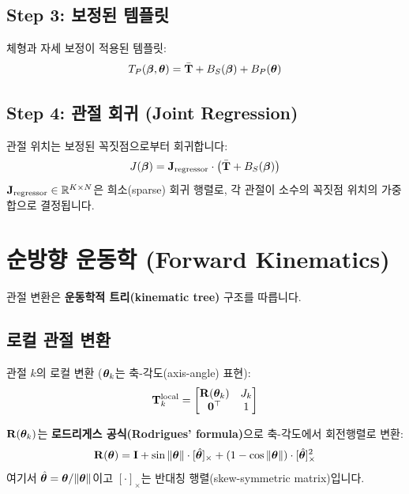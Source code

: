 \documentclass[11pt, a4paper]{report}
\begin{document}
\subsection{Step 3: 보정된 템플릿}

체형과 자세 보정이 적용된 템플릿:
\begin{equation}
T_P(\bm{\beta}, \bm{\theta}) = \bar{\mathbf{T}} + B_S(\bm{\beta}) + B_P(\bm{\theta})
\end{equation}

\subsection{Step 4: 관절 회귀 (Joint Regression)}

관절 위치는 보정된 꼭짓점으로부터 회귀합니다:
\begin{equation}
J(\bm{\beta}) = \mathbf{J}_{\text{regressor}} \cdot \big( \bar{\mathbf{T}} + B_S(\bm{\beta}) \big)
\label{eq:joint_regression}
\end{equation}
$\mathbf{J}_{\text{regressor}} \in \mathbb{R}^{K \times N}$은 희소(sparse) 회귀 행렬로, 각 관절이 소수의 꼭짓점 위치의 가중합으로 결정됩니다.


\section{순방향 운동학 (Forward Kinematics)}
\label{sec:fk}

관절 변환은 \textbf{운동학적 트리(kinematic tree)} 구조를 따릅니다.

\subsection{로컬 관절 변환}

관절 $k$의 로컬 변환 ($\bm{\theta}_k$는 축-각도(axis-angle) 표현):
\begin{equation}
\mathbf{T}_k^{\text{local}} =
\begin{bmatrix}
\mathbf{R}(\bm{\theta}_k) & J_k \\
\mathbf{0}^\top & 1
\end{bmatrix}
\end{equation}

$\mathbf{R}(\bm{\theta}_k)$는 \textbf{로드리게스 공식(Rodrigues' formula)}으로 축-각도에서 회전행렬로 변환:
\begin{equation}
\mathbf{R}(\bm{\theta}) = \mathbf{I} + \sin\|\bm{\theta}\| \cdot [\hat{\bm{\theta}}]_\times + (1 - \cos\|\bm{\theta}\|) \cdot [\hat{\bm{\theta}}]_\times^2
\end{equation}
여기서 $\hat{\bm{\theta}} = \bm{\theta}/\|\bm{\theta}\|$이고 $[\cdot]_\times$는 반대칭 행렬(skew-symmetric matrix)입니다.
\end{document}
